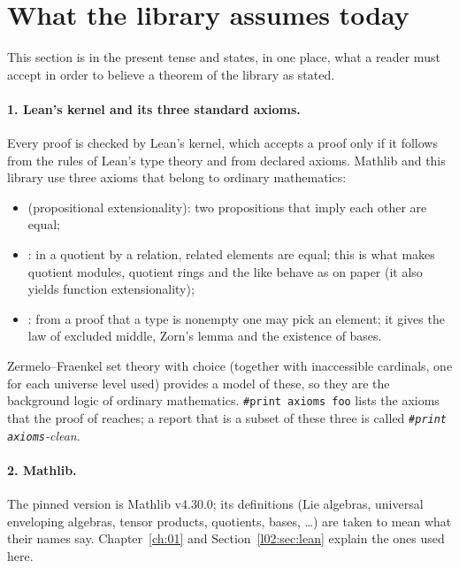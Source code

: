 \section{What the library assumes today}\label{l02:sec:assumes}

This section is in the present tense and states, in one place, what a reader must accept in order to
believe a theorem of the library as stated.

\paragraph{1. Lean's kernel and its three standard axioms.} Every proof is checked by Lean's kernel,
which accepts a proof only if it follows from the rules of Lean's type theory and from declared
axioms. Mathlib and this library use three axioms that belong to ordinary mathematics:
\begin{itemize}
\item {} (propositional extensionality): two propositions that imply each other are equal;
\item {}: in a quotient by a relation, related elements are equal; this is what makes
  quotient modules, quotient rings and the like behave as on paper (it also yields function
  extensionality);
\item {}: from a proof that a type is nonempty one may pick an element; it gives the
  law of excluded middle, Zorn's lemma and the existence of bases.
\end{itemize}
Zermelo--Fraenkel set theory with choice (together with inaccessible cardinals, one for each universe
level used) provides a model of these, so they are the background logic of ordinary mathematics.
\texttt{\#print axioms foo} lists the axioms that the proof of  reaches; a report that is a
subset of these three is called \emph{\texttt{\#print axioms}-clean}.

\paragraph{2. Mathlib.} The pinned version is Mathlib v4.30.0; its definitions (Lie algebras,
universal enveloping algebras, tensor products, quotients, bases, \ldots) are taken to mean what their
names say. Chapter~\ref{ch:01} and Section~\ref{l02:sec:lean} explain the ones used here.


